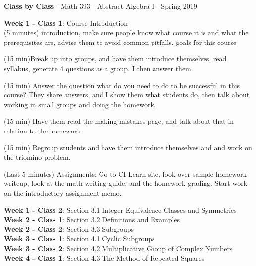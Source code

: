\documentclass[10pt]{amsart}
\begin{document}
\pagestyle{empty}

\begin{center}
{\bf Class by Class} - Math 393 - Abstract Algebra I - Spring 2019
\end{center}

{\bf Week 1 - Class 1}: Course Introduction\\

(5 minutes) introduction, make sure people know what course it is and what the prerequisites are, advise them to avoid common pitfalls, goals for this course

(15 min)Break up into groups, and have them introduce themselves, read syllabus, generate 4 questions as a group. I then answer them.

(15 min)  Answer the question what do you need to do to be successful in this course?  They share answers, and I show them what students do, then talk about working in small groups and doing the homework.

(15 min)  Have them read the making mistakes page, and talk about that in relation to the homework.

(15 min) Regroup students and have them introduce themselves and and work on the triomino problem.
 
 (Last 5 minutes) Assignments:  Go to CI Learn site, look over sample homework writeup, look at the math writing guide, and the homework grading.  Start work on the introductory assignment memo.

{\bf Week 1 - Class 2}: Section 3.1 Integer Equivalence Classes and Symmetries\\

{\bf Week 2 - Class 1}: Section 3.2 Definitions and Examples\\

{\bf Week 2 - Class 2}: Section 3.3 Subgroups\\
	
{\bf Week 3 - Class 1}: Section 4.1 Cyclic Subgroups\\


{\bf Week 3 - Class 2}: Section 4.2 Multiplicative Group of Complex Numbers\\

{\bf Week 4 - Class 1}: Section 4.3 The Method of Repeated Squares\\
\end{document}
